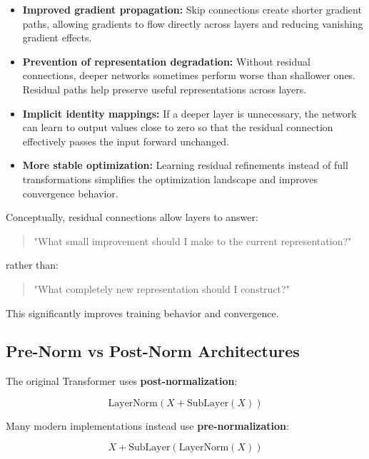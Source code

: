 \documentclass[11pt]{article}
\begin{document}
\begin{itemize}

\item \textbf{Improved gradient propagation:}  
Skip connections create shorter gradient paths, allowing gradients to flow directly across layers and reducing vanishing gradient effects.

\item \textbf{Prevention of representation degradation:}  
Without residual connections, deeper networks sometimes perform worse than shallower ones. Residual paths help preserve useful representations across layers.

\item \textbf{Implicit identity mappings:}  
If a deeper layer is unnecessary, the network can learn to output values close to zero so that the residual connection effectively passes the input forward unchanged.

\item \textbf{More stable optimization:}  
Learning residual refinements instead of full transformations simplifies the optimization landscape and improves convergence behavior.

\end{itemize}

Conceptually, residual connections allow layers to answer:

\begin{quote}
"What small improvement should I make to the current representation?"
\end{quote}

rather than:

\begin{quote}
"What completely new representation should I construct?"
\end{quote}

This significantly improves training behavior and convergence.

\subsection{Pre-Norm vs Post-Norm Architectures}

The original Transformer uses \textbf{post-normalization}:

\[
\text{LayerNorm}(X + \text{SubLayer}(X))
\]

Many modern implementations instead use \textbf{pre-normalization}:

\[
X + \text{SubLayer}(\text{LayerNorm}(X))
\]
\end{document}
